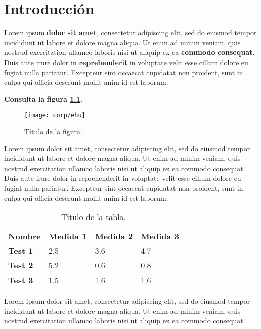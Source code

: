 \chapter{Introducción}

Lorem ipsum \textbf{dolor sit amet}, consectetur adipiscing elit, sed do eiusmod tempor incididunt ut labore et dolore magna aliqua. Ut enim ad minim veniam, quis nostrud exercitation ullamco laboris nisi ut aliquip ex ea \textbf{commodo consequat}. Duis aute irure dolor in \textbf{reprehenderit} in voluptate velit esse cillum dolore eu fugiat nulla pariatur. Excepteur sint occaecat cupidatat non proident, sunt in culpa qui officia deserunt mollit anim id est laborum. 

\textbf{Consulta la figura \ref{fig:devops}.}

\begin{figure}[H]
  \centering
  \texttt{[image: corp/ehu]}
  \caption{Título de la figura.}
  \label{fig:devops}
\end{figure}

Lorem ipsum dolor sit amet, consectetur adipiscing elit, sed do eiusmod tempor incididunt ut labore et dolore magna aliqua. Ut enim ad minim veniam, quis nostrud exercitation ullamco laboris nisi ut aliquip ex ea commodo consequat. Duis aute irure dolor in reprehenderit in voluptate velit esse cillum dolore eu fugiat nulla pariatur. Excepteur sint occaecat cupidatat non proident, sunt in culpa qui officia deserunt mollit anim id est laborum.

\begin{table}[H]
  \centering
  \begin{tabular}{llll}
    \textbf{Nombre} & \textbf{Medida 1} & \textbf{Medida 2} & \textbf{Medida 3} \\
    \textbf{Test 1} & 2.5               & 3.6               & 4.7               \\
    \textbf{Test 2} & 5.2               & 0.6               & 0.8               \\
    \textbf{Test 3} & 1.5               & 1.6               & 1.6              
  \end{tabular}
  \caption{Título de la tabla.}
\end{table}

Lorem ipsum dolor sit amet, consectetur adipiscing elit, sed do eiusmod tempor incididunt ut labore et dolore magna aliqua. Ut enim ad minim veniam, quis nostrud exercitation ullamco laboris nisi ut aliquip ex ea commodo consequat.

